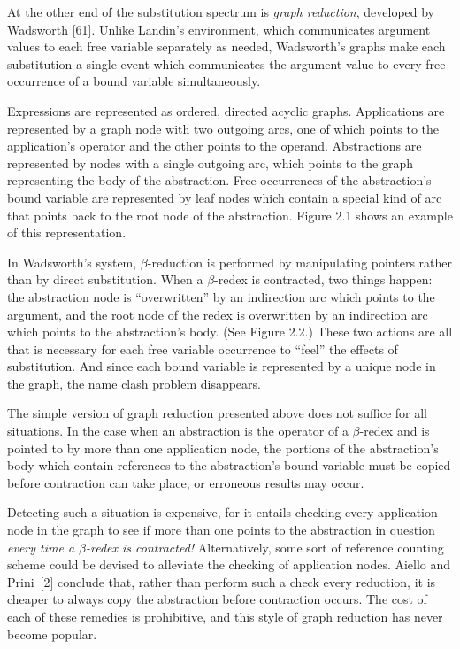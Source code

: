 At the other end of the substitution spectrum is \emph{graph reduction},
developed by Wadsworth [61]. Unlike Landin's environment, which communicates
argument values to each free variable separately as needed, Wadsworth's graphs
make each substitution a single event which communicates the argument value to
every free occurrence of a bound variable simultaneously.

Expressions are represented as ordered, directed acyclic graphs. Applications
are represented by a graph node with two outgoing arcs, one of which points to
the application's operator and the other points to the operand. Abstractions are
represented by nodes with a single outgoing arc, which points to the graph
representing the body of the abstraction. Free occurrences of the abstraction's
bound variable are represented by leaf nodes which contain a special kind of arc
that points back to the root node of the abstraction. Figure 2.1 shows an
example of this representation.

In Wadsworth's system, \(\beta\)-reduction is performed by manipulating pointers
rather than by direct substitution. When a \(\beta\)-redex is contracted, two
things happen: the abstraction node is ``overwritten'' by an indirection arc
which points to the argument, and the root node of the redex is overwritten by
an indirection arc which points to the abstraction's body. (See Figure 2.2.)
These two actions are all that is necessary for each free variable occurrence to
``feel'' the effects of substitution. And since each bound variable is
represented by a unique node in the graph, the name clash problem disappears.

The simple version of graph reduction presented above does not suffice for all
situations. In the case when an abstraction is the operator of a
\(\beta\)-redex and is pointed to by more than one application node, the
portions of the abstraction's body which contain references to the abstraction's
bound variable must be copied before contraction can take place, or erroneous
results may occur.

Detecting such a situation is expensive, for it entails checking every
application node in the graph to see if more than one points to the abstraction
in question \emph{every time a \(\beta\)-redex is contracted!} Alternatively, some sort
of reference counting scheme could be devised to alleviate the checking of
application nodes. Aiello and Prini~[2] conclude that, rather than perform such
a check every reduction, it is cheaper to always copy the abstraction before
contraction occurs. The cost of each of these remedies is prohibitive, and this
style of graph reduction has never become popular.

